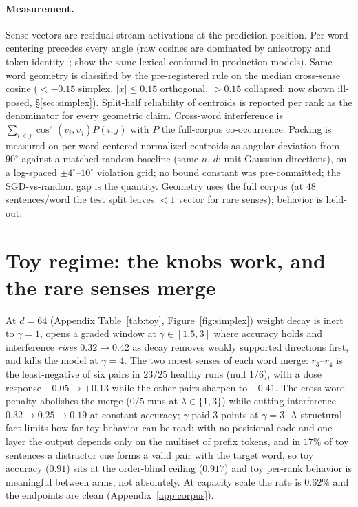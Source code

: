 \documentclass{article}
\newcommand{\degr}{^{\circ}}
\begin{document}
\paragraph{Measurement.} Sense vectors are residual-stream activations at the prediction
position. Per-word centering precedes every angle (raw cosines are dominated by
  anisotropy and token identity~\citep{ethayarajh2019contextual};
\citet{hou2026polysemanticity} show the same lexical confound in production models).
Same-word geometry is classified by the pre-registered rule on the median cross-sense
cosine ($<-0.15$ simplex, $|x|\le0.15$ orthogonal, $>0.15$ collapsed; now shown
ill-posed, \S\ref{sec:simplex}). Split-half
reliability of centroids is reported per rank as the denominator for every geometric
claim. Cross-word interference is $\sum_{i<j}\cos^2(v_i,v_j)P(i,j)$ with $P$ the
full-corpus co-occurrence. Packing is measured on per-word-centered normalized centroids
as angular deviation from $90\degr$ against a matched random baseline (same $n$, $d$;
unit Gaussian directions), on a log-spaced $\pm4\degr$--$10\degr$ violation grid; no
bound constant was pre-committed; the SGD-vs-random gap is the quantity. Geometry uses
the full corpus (at $48$ sentences/word the test split leaves $<1$ vector for rare
senses); behavior is held-out.

\section{Toy regime: the knobs work, and the rare senses merge}\label{sec:toy}

At $d{=}64$ (Appendix Table~\ref{tab:toy}, Figure~\ref{fig:simplex}) weight decay is
inert to $\gamma{=}1$, opens a graded window at $\gamma\in[1.5,3]$ where accuracy holds
and interference \emph{rises} $0.32\to0.42$ as decay removes weakly supported directions
first, and kills the model at $\gamma{=}4$. The two rarest senses of each word merge:
$r_3$--$r_4$ is the least-negative of six pairs in $23/25$ healthy runs (null $1/6$),
with a dose response $-0.05\to+0.13$ while the other pairs sharpen to $-0.41$. The
cross-word penalty abolishes the merge ($0/5$ runs at $\lambda\in\{1,3\}$) while cutting
interference $0.32\to0.25\to0.19$ at constant accuracy; $\gamma$ paid $3$ points at
$\gamma{=}3$. A structural fact limits how far toy behavior can be read: with no positional
code and one layer the output depends only on the multiset of prefix tokens, and in
$17\%$ of toy sentences a distractor cue forms a valid pair with the target word, so toy
accuracy ($0.91$) sits at the order-blind ceiling ($0.917$) and toy per-rank behavior is
meaningful between arms, not absolutely. At capacity scale the rate is $0.62\%$ and the
endpoints are clean (Appendix~\ref{app:corpus}).
\end{document}
